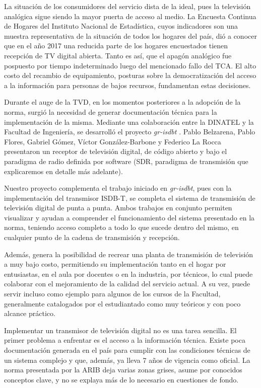 La situación de los consumidores del servicio dista de la ideal, pues la televisión analógica sigue siendo la mayor puerta de acceso al medio. La Encuesta Continua de Hogares del Instituto Nacional de Estadística\cite{ine2017}, cuyos indicadores son una muestra representativa de la situación de todos los hogares del país, dió a conocer que en el año 2017 una reducida parte de los hogares encuestados tienen recepción de TV digital abierta. Tanto es así, que el apagón analógico fue pospuesto por tiempo indeterminado luego del mencionado fallo del TCA. El alto costo del recambio de equipamiento, posturas sobre la democratización del acceso a la información para personas de bajos recursos, fundamentan estas decisiones.

Durante el auge de la TVD, en los momentos posteriores a la adopción de la norma, surgió la necesidad de generar documentación técnica para la implementación de la misma. Mediante una colaboración entre la DINATEL y la Facultad de Ingeniería, se desarrolló el proyecto \textit{gr-isdbt} \cite{winCom16}. Pablo Belzarena, Pablo Flores, Gabriel Gómez, Víctor González-Barbone y Federico La Rocca presentaron un receptor de televisión digital, de código abierto y bajo el paradigma de radio definida por software (\gls{SDR}, paradigma de transmisión que explicaremos en detalle más adelante).

Nuestro proyecto complementa el trabajo iniciado en \textit{gr-isdbt}, pues con la implementación del transmisor ISDB-T, se completa el sistema de transmisión de televisión digital de punta a punta. Ambos trabajos en conjunto permiten visualizar y ayudan a comprender el funcionamiento del sistema presentado en la norma, teniendo acceso completo a todo lo que sucede dentro del mismo, en cualquier punto de la cadena de transmisión y recepción. 

Además, genera la posibilidad de recrear una planta de transmisión de televisión a muy bajo costo, permitiendo su implementación tanto en el hogar por entusiastas, en el aula por docentes o en la industria, por técnicos, lo cual puede colaborar con el mejoramiento de la calidad del servicio actual. A su vez, puede servir incluso como ejemplo para algunos de los cursos de la Facultad, generalmente catalogados por el estudiantado como muy teóricos y con poco alcance práctico. 

Implementar un transmisor de televisión digital no es una tarea sencilla. El primer problema a enfrentar es el acceso a la información técnica. Existe poca documentación generada en el país para cumplir con las condiciones técnicas de un sistema complejo y que, además, ya lleva 7 años de vigencia como oficial. La norma presentada por la \gls{ARIB} deja varias zonas grises, asume por conocidos conceptos clave, y no se explaya más de lo necesario en cuestiones de fondo. 

